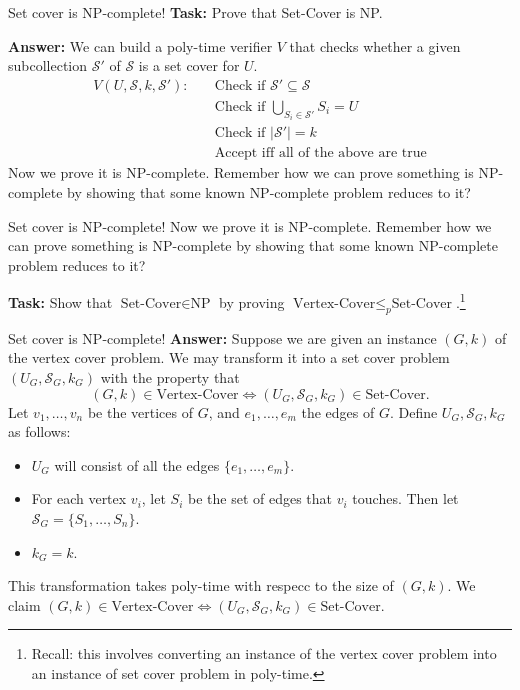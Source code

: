 \documentclass{beamer}
\begin{document}
\begin{frame}{Set cover is NP-complete!}
\textbf{Task:} Prove that Set-Cover is NP.

\vspace{2mm}

\textbf{Answer:} We can build a poly-time verifier $V$ that checks whether a given subcollection $\mathcal S'$ of $\mathcal S$ is a set cover for $U$.
\begin{align*}
V(U, \mathcal S, k, \mathcal S'): \quad &\text{Check if $\mathcal S' \subseteq \mathcal S$}\\
&\text{Check if $\bigcup_{S_i \in \mathcal S'} S_i = U$}\\
&\text{Check if $|\mathcal S'| = k$}\\
&\text{Accept iff all of the above are true}
\end{align*}
Now we prove it is NP-complete. Remember how we can prove something is NP-complete by showing that some known NP-complete problem reduces to it?
\end{frame}

\begin{frame}{Set cover is NP-complete!}
Now we prove it is NP-complete. Remember how we can prove something is NP-complete by showing that some known NP-complete problem reduces to it?

\textbf{Task:} Show that $\text{Set-Cover} \in \text{NP}$ by proving $\text{Vertex-Cover} \leq_p \text{Set-Cover}$.\footnote{Recall: this involves converting an instance of the vertex cover problem into an instance of set cover problem in poly-time.}
\end{frame}

\begin{frame}{Set cover is NP-complete!}
\textbf{Answer:} Suppose we are given an instance $(G, k)$ of the vertex cover problem. We may transform it into a set cover problem $(U_G, \mathcal S_G, k_G)$ with the property that $$(G, k) \in \text{Vertex-Cover} \Leftrightarrow (U_G, \mathcal S_G, k_G) \in \text{Set-Cover}.$$
Let $v_1, \ldots, v_n$ be the vertices of $G$, and $e_1, \ldots, e_m$ the edges of $G$. Define $U_G, \mathcal S_G, k_G$ as follows: 
\begin{itemize}
\item $U_G$ will consist of all the edges $\{e_1, \ldots, e_m\}$.
\item For each vertex $v_i$, let $S_i$ be the set of edges that $v_i$ touches. Then let $\mathcal S_G = \{S_1, \ldots, S_n\}$.
\item $k_G = k$.
\end{itemize}
This transformation takes poly-time with respecc to the size of $(G, k)$.
We claim $(G, k) \in \text{Vertex-Cover} \Leftrightarrow (U_G, \mathcal S_G, k_G) \in \text{Set-Cover}$.
\end{frame}
\end{document}
